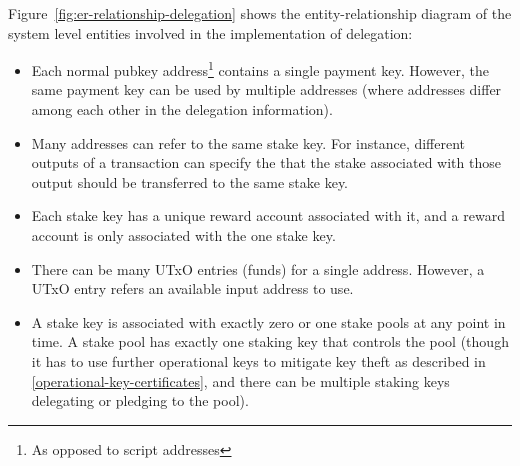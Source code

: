 \documentclass[11pt,a4paper]{article}
\begin{document}
Figure~\ref{fig:er-relationship-delegation} shows the entity-relationship
diagram of the system level entities involved in the implementation of
delegation:
\begin{itemize}
\item Each normal pubkey address\footnote{As opposed to script
  addresses}
  contains a single payment key. However, the same payment key
  can be used by multiple addresses (where addresses differ among each other in
  the delegation information).
\item Many addresses can refer to the same stake key. For instance, different
  outputs of a transaction can specify the that the stake associated with those
  output should be transferred to the same stake key.
\item Each stake key has a unique reward account associated with it, and a
  reward account is only associated with the one stake key.
\item There can be many UTxO entries (funds) for a single address. However, a
  UTxO entry refers an available input address to use.
\item A stake key is associated with exactly zero or one stake pools at any
  point in time. A stake pool has exactly one staking key that controls the pool
  (though it has to use further operational keys to mitigate key theft as described
  in \cref{operational-key-certificates}, and there can
  be multiple staking keys delegating or pledging to the pool).
\end{itemize}
\end{document}
